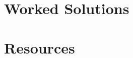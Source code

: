 \documentclass{book}
\begin{document}
\chapter{Worked Solutions}



\chapter{Resources}
\end{document}
